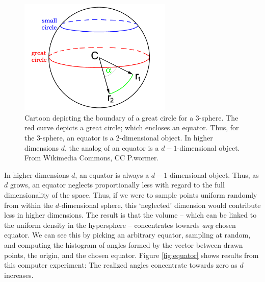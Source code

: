 \documentclass{article}
\begin{document}
\begin{figure}[!ht]
  \centering
  \includegraphics[width=0.65\textwidth]{../../images/great_circle}
  \caption{Cartoon depicting the boundary of a great circle for a 3-sphere. The
    red curve depicts a great circle; which encloses an equator. Thus, for the
    3-sphere, an equator is a 2-dimensional object. In higher dimensions $d$,
    the analog of an equator is a $d-1$-dimensional object. From Wikimedia
    Commons, CC P.wormer.}
  \label{fig:great-circle}
\end{figure}

In higher dimensions $d$, an equator is always a $d-1$-dimensional object. Thus,
as $d$ grows, an equator neglects proportionally less with regard to the full
dimensionality of the space. Thus, if we were to sample points uniform randomly
from within the $d$-dimensional sphere, this `neglected' dimension would
contribute less in higher dimensions. The result is that the volume -- which can
be linked to the uniform density in the hypersphere -- concentrates towards
\emph{any} chosen equator. We can see this by picking an arbitrary equator,
sampling at random, and computing the histogram of angles formed by the vector
between drawn points, the origin, and the chosen equator. Figure
\ref{fig:equator} shows results from this computer experiment: The realized
angles concentrate towards zero as $d$ increases.
\end{document}
